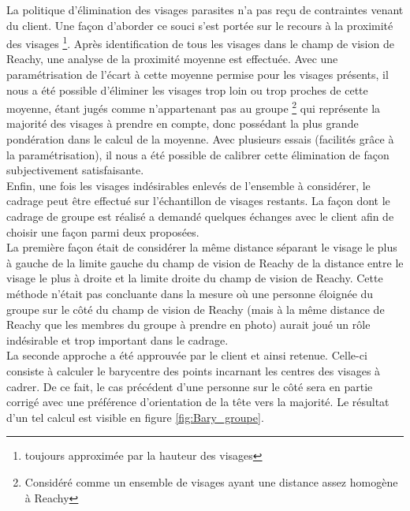 \documentclass[a4paper,french]{article}
\begin{document}
La politique d'élimination des visages parasites n'a pas reçu de contraintes venant du client. Une façon d'aborder ce souci s'est portée sur le recours à la proximité des visages \footnote{toujours approximée par la hauteur des visages}. Après identification de tous les visages dans le champ de vision de Reachy, une analyse de la proximité moyenne est effectuée. Avec une paramétrisation de l'écart à cette moyenne permise pour les visages présents, il nous a été possible d'éliminer les visages trop loin ou trop proches de cette moyenne, étant jugés comme n'appartenant pas au groupe \footnote{Considéré comme un ensemble de visages ayant une distance assez homogène à Reachy} qui représente la majorité des visages à prendre en compte, donc possédant la plus grande pondération dans le calcul de la moyenne. Avec plusieurs essais (facilités grâce à la paramétrisation), il nous a été possible de calibrer cette élimination de façon subjectivement satisfaisante.\\

Enfin, une fois les visages indésirables enlevés de l'ensemble à considérer, le cadrage peut être effectué sur l'échantillon de visages restants. La façon dont le cadrage de groupe est réalisé a demandé quelques échanges avec le client afin de choisir une façon parmi deux proposées.\\

La première façon était de considérer la même distance séparant le visage le plus à gauche de la limite gauche du champ de vision de Reachy de la distance entre le visage le plus à droite et la limite droite du champ de vision de Reachy. Cette méthode n'était pas concluante dans la mesure où une personne éloignée du groupe sur le côté du champ de vision de Reachy (mais à la même distance de Reachy que les membres du groupe à prendre en photo) aurait joué un rôle indésirable et trop important dans le cadrage.\\
La seconde approche a été approuvée par le client et ainsi retenue. Celle-ci consiste à calculer le barycentre des points incarnant les centres des visages à cadrer. De ce fait, le cas précédent d'une personne sur le côté sera en partie corrigé avec une préférence d'orientation de la tête vers la majorité. Le résultat d'un tel calcul est visible en figure \ref{fig:Bary_groupe}.\\
\end{document}
